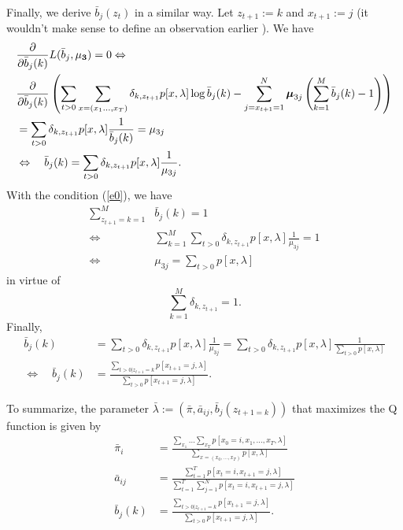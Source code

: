 \documentclass{article}
\begin{document}
Finally, we derive $\bar b_j(z_t)$ in a similar way.
Let $z_{t+1}:= k$ and $x_{t+1}:=j$ (it wouldn't make sense to define an observation earlier ).
We have 
\begin{align} 
 &\frac{\partial}{\partial \bar b_j(k)} L(\bar b_j,{\bf{\mu_3}}) = 0 \Leftrightarrow \\
 &\frac{\partial}{\partial \bar b_j(k)} \left( \sum_{t>0}\sum_{x = (x_1...,x_T)} \delta_{k,z_{t+1}} p[x,\lambda] \log \bar b_j(k) -\sum_{j=x_{t+1}=1}^N\boldsymbol \mu_{3j}\left(\sum_{k=1}^M \bar b_j(k)  - 1\right) \right) \label{e3} \nonumber \\
&=
\sum_{t>0} \delta_{k,z_{t+1}} p[x,\lambda] \frac{1}{\bar b_j(k)} = \mu_{3j}\\
& \Leftrightarrow \quad
 \bar b_j(k) = \sum_{t>0} \delta_{k,z_{t+1}} p[x,\lambda] \frac{1}{\mu_{3j}}. 
\end{align}
With the condition (\ref{e0}), we have 
\begin{align}
\sum_{z_{t+1}=k=1}^M & \bar b_j(k)  = 1 \\
\Leftrightarrow
& \sum_{k=1}^M \sum_{t>0} \delta_{k,z_{t+1}} p[x,\lambda] \frac{1}{\mu_{3j}} =1 \\
\Leftrightarrow \quad
& \mu_{3j} =  \sum_{t>0} p[x,\lambda]
\end{align} in virtue of
\begin{equation}
    \sum_{k=1}^M \delta_{k,z_{t+1}} = 1.
\end{equation}
Finally,
\begin{align}
\bar b_j(k) & = \sum_{t>0} \delta_{k,z_{t+1}} p[x,\lambda] \frac{1}{\mu_{3j}} = 
\sum_{t>0} \delta_{k,z_{t+1}} p[x,\lambda] \frac{1}{\sum_{t>0} p[x,\lambda]}\\
\Leftrightarrow \quad
\bar b_j(k) & = \frac{\sum_{t>0| z_{t+1} = k} p[x_{t+1}=j,\lambda]}{\sum_{t>0} p[x_{t+1}=j,\lambda]}.
\end{align}

To summarize, the parameter $\bar \lambda := (\bar \pi ,\bar a_{ij}, \bar b_j(z_{t+1=k}))$ that maximizes the Q function is given by
\begin{align}
\bar \pi_i &=  \frac{\sum_{x_1}...\sum_{x_T} \label{e6} p[x_0 = i ,x_1,...,x_T,\lambda]}{\sum_{x=(x_0,...,x_T)} p[x,\lambda]}
\\
\bar a_{ij} &= \frac{\sum_{t=1}^T  p[x_t=i,x_{t+1}=j,\lambda]}  {\sum_{t=1}^T \sum_{j =1}^N p[x_t=i,x_{t+1}=j,\lambda]}
\\
 \bar b_j(k) & = \frac{\sum_{t>0| z_{t+1} = k} p[x_{t+1}=j,\lambda]}{\sum_{t>0} p[x_{t+1}=j,\lambda]}.   
\end{align}
\end{document}
